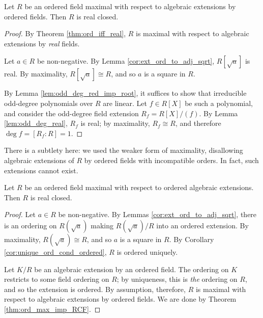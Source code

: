 \begin{theorem}
  \label{thm:ord_max_imp_RCF}
  Let $R$ be an ordered field maximal with respect to algebraic extensions by ordered fields. Then $R$ is real closed.
\end{theorem}
\begin{proof}
  By Theorem \ref{thm:ord_iff_real}, $R$ is maximal with respect to algebraic extensions by \textit{real} fields.

  Let $a\in R$ be non-negative. By Lemma \ref{cor:ext_ord_to_adj_sqrt}, $R[\sqrt{a}]$ is real. By maximality, $R[\sqrt{a}]\cong R$, and so $a$ is a square in $R$.

  By Lemma \ref{lem:odd_deg_red_imp_root}, it suffices to show that irreducible odd-degree polynomials over $R$ are linear. Let $f\in R[X]$ be such a polynomial, and consider the odd-degree field extension $R_f=R[X]/(f)$. By Lemma \ref{lem:odd_deg_real}, $R_f$ is real; by maximality, $R_f\cong R$, and therefore $\deg f=[R_f:R]=1$.
\end{proof}

There is a subtlety here: we used the weaker form of maximality, disallowing algebraic extensions of $R$ by ordered fields with incompatible orders. In fact, such extensions cannot exist.

\begin{corollary}
  \label{cor:ord_max_imp_RCF_strong}
  Let $R$ be an ordered field maximal with respect to ordered algebraic extensions. Then $R$ is real closed.
\end{corollary}
\begin{proof}
  Let $a\in R$ be non-negative. By Lemmas \ref{cor:ext_ord_to_adj_sqrt}, there is an ordering on $R(\sqrt{a})$ making $R(\sqrt{a})/R$ into an ordered extension. By maximality, $R(\sqrt{a})\cong R$, and so $a$ is a square in $R$. By Corollary \ref{cor:unique_ord_cond_ordered}, $R$ is ordered uniquely.

  Let $K/R$ be an algebraic extension by an ordered field. The ordering on $K$ restricts to some field ordering on $R$; by uniqueness, this is \textit{the} ordering on $R$, and so the extension is ordered. By assumption, therefore, $R$ is maximal with respect to algebraic extensions by ordered fields. We are done by Theorem \ref{thm:ord_max_imp_RCF}.
\end{proof}

